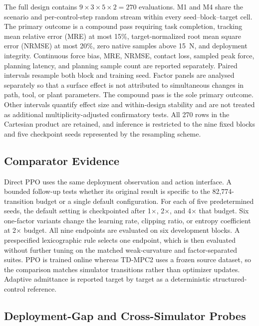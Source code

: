 The full design contains $9\times3\times5\times2=270$ evaluations. M1 and M4
share the scenario and per-control-step random stream within every
seed--block--target cell. The primary outcome is a compound pass requiring
task completion, tracking mean relative error (MRE) at most 15\%,
target-normalized root mean square error (NRMSE) at most 20\%, zero native
samples above 15~N, and deployment integrity.
Continuous force bias, MRE, NRMSE, contact loss, sampled peak force, planning
latency, and planning sample count are reported separately. Paired intervals
resample both block and training seed. Factor panels are analysed separately
so that a surface effect is not attributed to simultaneous changes in path,
tool, or plant parameters.
The compound pass is the sole primary outcome. Other intervals quantify effect
size and within-design stability and are not treated as additional
multiplicity-adjusted confirmatory tests. All 270 rows in the Cartesian product
are retained, and inference is restricted to the nine fixed blocks and five
checkpoint seeds represented by the resampling scheme.

\subsection{Comparator Evidence}

Direct PPO uses the same deployment observation and action interface. A
bounded follow-up tests whether its original result is specific to the
82,774-transition budget or a single default configuration. For each of five
predetermined seeds, the default setting is checkpointed after 1$\times$,
2$\times$, and 4$\times$ that budget. Six one-factor variants change the
learning rate, clipping ratio, or entropy coefficient at 2$\times$ budget.
All nine endpoints are evaluated on six development blocks. A prespecified
lexicographic rule selects one endpoint, which is then evaluated without
further tuning on the matched weak-curvature and factor-separated suites.
PPO is trained online whereas TD-MPC2 uses a frozen source dataset, so the
comparison matches simulator transitions rather than optimizer updates.
Adaptive admittance is reported target by target as a deterministic
structured-control reference.

\subsection{Deployment-Gap and Cross-Simulator Probes}

